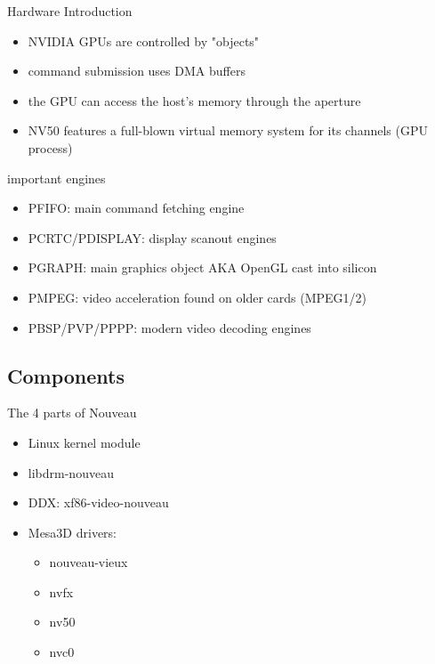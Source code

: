 \documentclass[11pt,english,compress]{beamer}
\begin{document}
		\begin{frame}
			\begin{block}{Hardware Introduction}
				\begin{itemize}
					\item NVIDIA GPUs are controlled by "objects"
					\item command submission uses DMA buffers
					\item the GPU can access the host's memory through the aperture
					\item NV50 features a full-blown virtual memory system for its channels (GPU process)
				\end{itemize}
			\end{block}
			\begin{block}{important engines}
				\begin{itemize}
					\item PFIFO: main command fetching engine
					\item PCRTC/PDISPLAY: display scanout engines
					\item PGRAPH: main graphics object AKA OpenGL cast into silicon
					\item PMPEG: video acceleration found on older cards (MPEG1/2)
					\item PBSP/PVP/PPPP: modern video decoding engines %
				\end{itemize}
			\end{block}
		\end{frame}

	\subsection{Components}
		\begin{frame}
			\begin{block}{The 4 parts of Nouveau}
				\begin{itemize}
					\item Linux kernel module
					\item libdrm-nouveau
					\item DDX: xf86-video-nouveau
					\item Mesa3D drivers:
						\begin{itemize}
							\item nouveau-vieux
							\item nvfx
							\item nv50
							\item nvc0
						\end{itemize}
				\end{itemize}
			\end{block}
		\end{frame}
\end{document}
